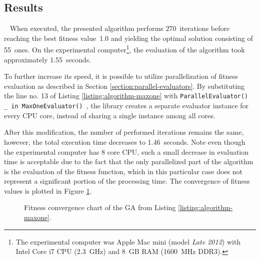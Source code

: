 \subsection{Results}~\label{section:maxone-results}
When executed, the presented algorithm performs 270~iterations before reaching the best fitness value~1.0 and yielding the optimal solution consisting of 55~ones. On the experimental computer\footnote{The experimental computer was Apple Mac mini (model \textit{Late 2012}) with Intel Core i7 CPU (2.3~GHz) and 8~GB RAM (1600~MHz DDR3).}, the evaluation of the algorithm took approximately 1.55~seconds.

To further increase its speed, it is possible to utilize parallelization of fitness evaluation as described in Section \ref{section:parallel-evaluators}. By substituting the line no. 13 of Listing \ref{listing:algorithm-maxone} with \texttt{ParallelEvaluator() { _ in MaxOneEvaluator() }}, the library creates a separate evaluator instance for every CPU core, instead of sharing a single instance among all cores.

After this modification, the number of performed iterations remains the same, however, the total execution time decreases to 1.46~seconds. Note even though the experimental computer has 8 core CPU, such a small decrease in evaluation time is acceptable due to the fact that the only parallelized part of the algorithm is the evaluation of the fitness function, which in this particular case does not represent a significant portion of the processing time. The convergence of fitness values is plotted in Figure \ref{fig:maxone-fitness}.

\begin{figure}[ht]
	\centering
	\caption[MAX-ONE genetic algorithm fitness convergence chart.]{Fitness convergence chart of the GA from Listing \ref{listing:algorithm-maxone}.}
	\label{fig:maxone-fitness}
\end{figure}

